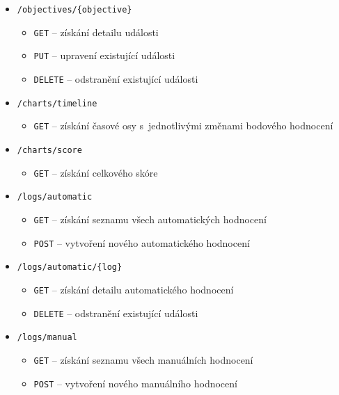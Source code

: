 \documentclass[
  digital,
  twoside,
  table, 
  nolof, 
  nolot
]{fithesis3}
\begin{document}
\begin{itemize}
    \item \texttt{/objectives/\{objective\}}
    \begin{itemize}
        \item \texttt{GET} -- získání detailu události
        \item \texttt{PUT} -- upravení existující události
        \item \texttt{DELETE} -- odstranění existující události
    \end{itemize}
        
    \item \texttt{/charts/timeline}
    \begin{itemize}
        \item \texttt{GET} -- získání časové osy s~jednotlivými změnami bodového hodnocení
    \end{itemize}
        
    \item \texttt{/charts/score}
    \begin{itemize}
        \item \texttt{GET} -- získání celkového skóre
    \end{itemize}
        
    \item \texttt{/logs/automatic}
    \begin{itemize}
        \item \texttt{GET} -- získání seznamu všech automatických hodnocení
        \item \texttt{POST} --  vytvoření nového automatického hodnocení
    \end{itemize}
        
    \item \texttt{/logs/automatic/\{log\}}
    \begin{itemize}
        \item \texttt{GET} -- získání detailu automatického hodnocení
        \item \texttt{DELETE} -- odstranění existující události
    \end{itemize}
            
    \item \texttt{/logs/manual}
    \begin{itemize}
        \item \texttt{GET} -- získání seznamu všech manuálních hodnocení
        \item \texttt{POST} --  vytvoření nového manuálního hodnocení
    \end{itemize}
            

\end{itemize}
\end{document}
